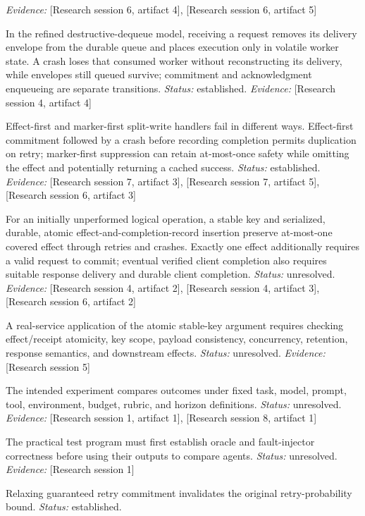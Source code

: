 \documentclass[11pt]{article}
\begin{document}
\begin{sloppypar}
\begin{description}
\textit{Evidence: }[Research session 6, artifact 4], [Research session 6, artifact 5]
\item[C12] In the refined destructive-dequeue model, receiving a request removes its delivery envelope from the durable queue and places execution only in volatile worker state. A crash loses that consumed worker without reconstructing its delivery, while envelopes still queued survive; commitment and acknowledgment enqueueing are separate transitions. \textit{Status: }established.
\textit{Evidence: }[Research session 4, artifact 4]
\item[C11] Effect-first and marker-first split-write handlers fail in different ways. Effect-first commitment followed by a crash before recording completion permits duplication on retry; marker-first suppression can retain at-most-once safety while omitting the effect and potentially returning a cached success. \textit{Status: }established.
\textit{Evidence: }[Research session 7, artifact 3], [Research session 7, artifact 5], [Research session 6, artifact 3]
\item[C10] For an initially unperformed logical operation, a stable key and serialized, durable, atomic effect-and-completion-record insertion preserve at-most-one covered effect through retries and crashes. Exactly one effect additionally requires a valid request to commit; eventual verified client completion also requires suitable response delivery and durable client completion. \textit{Status: }unresolved.
\textit{Evidence: }[Research session 4, artifact 2], [Research session 4, artifact 3], [Research session 6, artifact 2]
\item[C85] A real-service application of the atomic stable-key argument requires checking effect/receipt atomicity, key scope, payload consistency, concurrency, retention, response semantics, and downstream effects. \textit{Status: }unresolved.
\textit{Evidence: }[Research session 5]
\item[C31] The intended experiment compares outcomes under fixed task, model, prompt, tool, environment, budget, rubric, and horizon definitions. \textit{Status: }unresolved.
\textit{Evidence: }[Research session 1, artifact 1], [Research session 8, artifact 1]
\item[C30] The practical test program must first establish oracle and fault-injector correctness before using their outputs to compare agents. \textit{Status: }unresolved.
\textit{Evidence: }[Research session 1]
\item[C9] Relaxing guaranteed retry commitment invalidates the original retry-probability bound. \textit{Status: }established.

\end{description}
\end{sloppypar}
\end{document}
